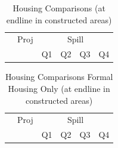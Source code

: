 \documentclass[12pt]{article}
\begin{document}
\begin{table}[h!]
	\centering
	\caption{Housing Comparisons (at endline in constructed areas)}
\vspace{-2mm}
\begin{tabular}{l*{1}{ccccc}}
\toprule
& Proj & \multicolumn{4}{c}{ Spill} \\
&  & Q1 & Q2 & Q3 &Q4 \\
\midrule
 
\bottomrule
\end{tabular}
\end{table}



\begin{table}[h!]
	\centering
	\caption{Housing Comparisons Formal Housing Only (at endline in constructed areas)}
\vspace{-2mm}
\begin{tabular}{l*{1}{ccccc}}
\toprule
& Proj & \multicolumn{4}{c}{ Spill} \\
&  & Q1 & Q2 & Q3 &Q4 \\
\midrule
 
\bottomrule
\end{tabular}
\end{table}
\end{document}
